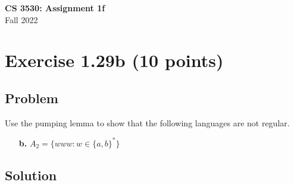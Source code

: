 \documentclass{article}
\begin{document}
\begin{empfile}

\begin{center}
\textbf{\Large CS 3530: Assignment 1f} \\[2mm]
Fall 2022
\end{center}

\raggedright

\section*{Exercise 1.29b (10 points)}

\subsection*{Problem}

Use the pumping lemma to show that the following languages are not regular.
\begin{enumerate}
\item[\bfseries b.] $A_2=\{www:w\in\{a,b\}^*\}$
\end{enumerate}

\subsection*{Solution}






\end{empfile}
\end{document}
